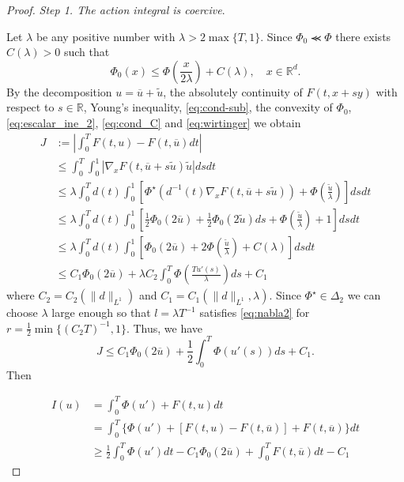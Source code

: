 \documentclass[twoside]{article}
\theoremstyle{remark}
\newcommand{\rr}{\mathbb{R}}
\renewcommand{\leq}{\leqslant}
\renewcommand{\geq}{\geqslant}
\begin{document}
\begin{proof} \emph{Step 1. The action integral is coercive}.
 
  
  Let $\lambda$ be any positive number with $\lambda>2\max\{T,1\}$. Since $\Phi_0\llcurly \Phi$ there exists $C(\lambda)>0$ such that 
  \begin{equation}\label{eq:cond_C}
    \Phi_0(x)\leq \Phi\left(\frac{x}{2\lambda}\right)+C(\lambda),\quad  x\in\rr^d. 
  \end{equation}
By the decomposition $u=\overline{u}+\tilde{u}$, the absolutely continuity of $F(t,x+sy)$ with respect to $s\in\rr$,  Young's inequality, \eqref{eq:cond-sub}, the convexity of $\Phi_0$, \ref{eq:escalar_ine_2}, \eqref{eq:cond_C} and \eqref{eq:wirtinger}  we obtain
\begin{equation*}\label{eq:cota-dif-F}
\begin{split}
J&:=\left|\int_0^T F(t,u)-F(t,\overline{u})dt\right|
\\
&\leq \int_0^T \int_0^1 |\nabla_x F(t,\overline{u}+s\tilde{u})\tilde{u}|dsdt
\\
&\leq
\lambda \int_0^T d(t) \int_0^1 \left[ \Phi^{\star}\left(d^{-1}(t)\nabla_xF(t,\overline{u}+s\tilde{u})\right)+\Phi\left(\frac{\tilde{u}}{\lambda}\right)\right]dsdt
\\
&\leq
\lambda\int_0^T d(t)\int_0^1\left[ \frac12\Phi_0(2\overline{u})+\frac12\Phi_0(2\tilde{u})ds+\Phi\left(\frac{\tilde{u}}{\lambda}\right)+1 \right]dsdt
\\
&\leq
\lambda\int_0^T d(t)\int_0^1\left[ \Phi_0(2\overline{u})+2\Phi\left(\frac{\tilde{u}}{\lambda}\right)+C(\lambda) \right]dsdt
\\
&\leq C_1 \Phi_0(2\overline{u})+\lambda C_2 \int_0^T \Phi\left(\frac{Tu'(s)}{\lambda}\right)ds+C_1
\end{split}
\end{equation*}
where $C_2=C_2(\|d\|_{L^1})$ and $C_1=C_1(\|d\|_{L^1},\lambda)$.  Since $\Phi^{\star} \in \Delta_2$ we can choose $\lambda$ large enough so that $l=\lambda T^{-1}$ satisfies  \eqref{eq:nabla2} for $r=\frac12 \min\{(C_2T)^{-1},1\}$. Thus, we have
\[
 J\leq C_1 \Phi_0(2\overline{u})+\frac12 \int_0^T \Phi\left(u'(s)\right)ds+C_1.
\]
Then

\begin{equation}
\begin{split}
I(u)&=\int_0^T  \Phi(u')+F(t,u)dt\\
&= \int_0^T \{\Phi(u')+[F(t,u)-F(t,\overline{u})]+F(t,\overline{u})\}dt
\\
&\geq
\frac12\int_0^T \Phi(u')dt-C_1\Phi_0(2 \overline{u})+\int_0^T F(t,\overline{u})dt-C_1
\end{split}
\end{equation}


\end{proof}
\end{document}
